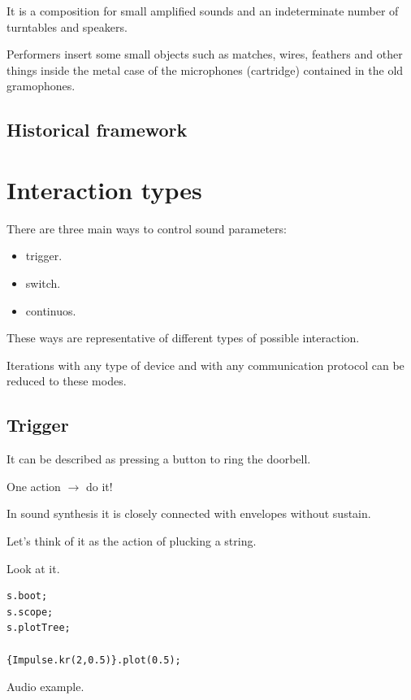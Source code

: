 It is a composition for small amplified sounds and an indeterminate number of turntables and speakers.

Performers insert some small objects such as matches, wires, feathers and other things inside the metal case of the microphones (cartridge) contained in the old gramophones.



\subsection{Historical framework}\label{historical-framework}

\section{Interaction types}\label{interaction-types}

There are three main ways to control sound parameters:

\begin{itemize}
\tightlist
\item trigger. 
\item switch.
\item continuos.
\end{itemize}

These ways are representative of different types of possible interaction.

Iterations with any type of device and with any communication protocol can be reduced to these modes.

\subsection{Trigger}\label{trigger}

It can be described as pressing a button to ring the doorbell.

One action \(\rightarrow\) do it!

In sound synthesis it is closely connected with envelopes without sustain.

Let's think of it as the action of plucking a string.

Look at it.

\begin{lstlisting}[frame=single] 
s.boot;
s.scope;
s.plotTree;

{Impulse.kr(2,0.5)}.plot(0.5); 
\end{lstlisting}

Audio example.

